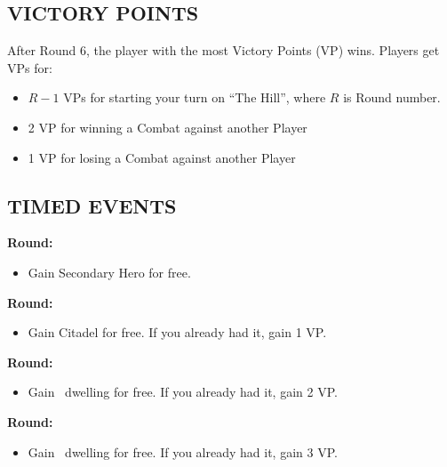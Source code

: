 \begin{multicols}{2}
\subsection*{\MakeUppercase{Victory Points}}
After Round 6, the player with the most Victory Points (VP) wins.
Players get VPs for:
\begin{itemize}
  \item $R-1$ VPs for starting your turn on ``The Hill'', where $R$ is Round number.
  \item 2 VP for winning a Combat against another Player
  \item 1 VP for losing a Combat against another Player
\end{itemize}

\subsection*{\MakeUppercase{Timed Events}}

\textbf{ Round:}
\begin{itemize}
  \item Gain Secondary Hero for free.
\end{itemize}
\textbf{ Round:}
\begin{itemize}
  \item Gain Citadel for free. If you already had it, gain 1 VP.
\end{itemize}
\textbf{ Round:}
\begin{itemize}
  \item Gain \silver\ dwelling for free. If you already had it, gain 2 VP.
\end{itemize}
\textbf{ Round:}
\begin{itemize}
  \item Gain \golden\ dwelling for free. If you already had it, gain 3 VP.
\end{itemize}


\end{multicols}
